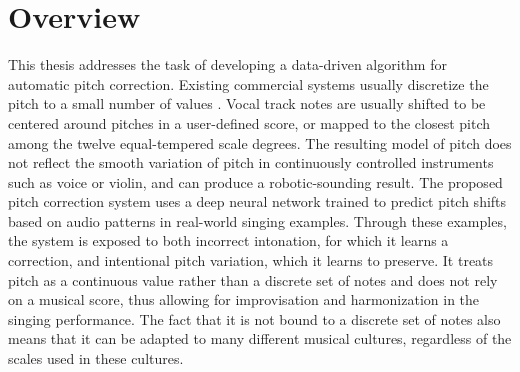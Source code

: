 \section{Overview}
This thesis addresses the task of developing a data-driven algorithm for automatic pitch correction. Existing commercial systems usually discretize the pitch to a small number of values \cite{antares:2016}. Vocal track notes are usually shifted to be centered around pitches in a user-defined score, or mapped to the closest pitch among the twelve equal-tempered scale degrees. The resulting model of pitch does not reflect the smooth variation of pitch in continuously controlled instruments such as voice or violin, and can produce a robotic-sounding result. The proposed pitch correction system uses a deep neural network trained to predict pitch shifts based on audio patterns in real-world singing examples. Through these examples, the system is exposed to both incorrect intonation, for which it learns a correction, and intentional pitch variation, which it learns to preserve. It treats pitch as a continuous value rather than a discrete set of notes and does not rely on a musical score, thus allowing for improvisation and harmonization in the singing performance. The fact that it is not bound to a discrete set of notes also means that it can be adapted to many different musical cultures, regardless of the scales used in these cultures. 


